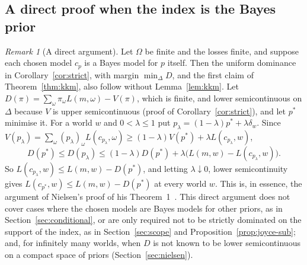 \documentclass[11pt]{article}
\theoremstyle{definition}
\theoremstyle{remark}
\newtheorem{remark}[theorem]{Remark}
\begin{document}
\subsection{A direct proof when the index is the Bayes prior}\label{sec:direct}
\begin{remark}[A direct argument]\label{rem:direct}
Let $\Omega$ be finite and the losses finite, and suppose each chosen model $c_p$ is a Bayes model for $p$ itself. Then the uniform dominance in Corollary~\ref{cor:strict}, with margin $\min_\Delta D$, and the first claim of Theorem~\ref{thm:kkm}, also follow without Lemma~\ref{lem:kkm}. Let $D(\pi)=\sum_\omega\pi_\omega L(m,\omega)-V(\pi)$, which is finite, and lower semicontinuous on $\Delta$ because $V$ is upper semicontinuous (proof of Corollary~\ref{cor:strict}), and let $p^*$ minimise it. For a world $w$ and $0<\lambda\le1$ put $p_\lambda=(1-\lambda)p^*+\lambda\delta_w$. Since $V(p_\lambda)=\sum_\omega(p_\lambda)_\omega L(c_{p_\lambda},\omega)\ge(1-\lambda)V(p^*)+\lambda L(c_{p_\lambda},w)$,
\[
 D(p^*)\le D(p_\lambda)\le(1-\lambda)D(p^*)+\lambda\bigl(L(m,w)-L(c_{p_\lambda},w)\bigr).
\]
So $L(c_{p_\lambda},w)\le L(m,w)-D(p^*)$, and letting $\lambda\downarrow0$, lower semicontinuity gives $L(c_{p^*},w)\le L(m,w)-D(p^*)$ at every world $w$. This is, in essence, the argument of Nielsen's proof of his Theorem~1~\cite[Appendix~C]{Nielsen}. This direct argument does not cover cases where the chosen models are Bayes models for other priors, as in Section~\ref{sec:conditional}, or are only required not to be strictly dominated on the support of the index, as in Section~\ref{sec:scope} and Proposition~\ref{prop:joyce-sub}; and, for infinitely many worlds, when $D$ is not known to be lower semicontinuous on a compact space of priors (Section~\ref{sec:nielsen}).
\end{remark}
\end{document}
